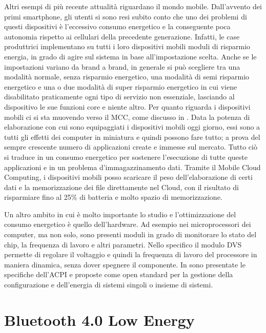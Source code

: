 Altri esempi di più recente attualità riguardano il mondo mobile. Dall'avvento dei primi smartphone, gli utenti si sono resi subito conto che uno dei problemi di questi dispositivi è l'eccessivo consumo energetico e la conseguente poca autonomia rispetto ai cellulari della precedente generazione. Infatti, le case produttrici implementano su tutti i loro dispositivi mobili moduli di risparmio energia, in grado di agire sul sistema in base all'impostazione scelta. Anche se le impostazioni variano da brand a brand, in generale si può scegliere tra una modalità normale, senza risparmio energetico, una modalità di semi risparmio energetico e una o due modalità di super risparmio energetico in cui viene disabilitato praticamente ogni tipo di servizio non essenziale, lasciando al dispositivo le sue funzioni core e niente altro. Per quanto riguarda i dispositivi mobili ci si sta muovendo verso il \acf{MCC}, come discusso in \cite{DinhLeeNiyatoWand2013-surveyMCC} . Data la potenza di elaborazione con cui sono equipaggiati i dispositivi mobili oggi giorno, essi sono a tutti gli effetti dei computer in miniatura e quindi possono fare tutto; a prova del sempre crescente numero di applicazioni create e immesse sul mercato. Tutto ciò si traduce in un consumo energetico per sostenere l'esecuzione di tutte queste applicazioni e in un problema d'immagazzinamento dati. Tramite il Mobile Cloud Computing, i dispositivi mobili posso scaricare il peso dell'elaborazione di certi dati e la memorizzazione dei file direttamente nel Cloud, con il risultato di risparmiare fino al 25\% di batteria e molto spazio di memorizzazione.

Un altro ambito in cui è molto importante lo studio e l'ottimizzazione del consumo energetico è quello dell'hardware. Ad esempio nei microprocessori dei computer, ma non solo, sono presenti moduli in grado di monitorare lo stato del chip, la frequenza di lavoro e altri parametri. Nello specifico il modulo \acf{DVS} permette di regolare il voltaggio e quindi la frequenza di lavoro del processore in maniera dinamica, senza dover spegnere il componente. In \cite{MarzollaMirandola2013-dpm} sono presentate le specifiche dell'\acf{ACPI} e proposte come open standard per la gestione della configurazione e dell'energia di sistemi singoli o insieme di sistemi.
\bigskip

 \section{Bluetooth 4.0 Low Energy}
 \label{sec:ble}

